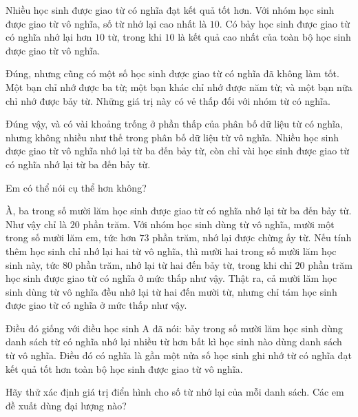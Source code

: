 {\begin{scriptlist}
      \item [Học sinh A:] Nhiều học sinh được giao từ có nghĩa đạt kết quả tốt hơn. Với nhóm học sinh được giao từ vô nghĩa, số từ nhớ lại cao nhất là $10$. Có bảy học sinh được giao từ có nghĩa nhớ lại hơn $10$ từ, trong khi $10$ là kết quả cao nhất của toàn bộ học sinh được giao từ vô nghĩa. \vspace{\baselineskip}

      \item [Học sinh B:] Đúng, nhưng cũng có một số học sinh được giao từ có nghĩa đã không làm tốt. Một bạn chỉ nhớ được ba từ; một bạn khác chỉ nhớ được năm từ; và một bạn nữa chỉ nhớ được bảy từ. Những giá trị này có vẻ thấp đối với nhóm từ có nghĩa.

      \item [Học sinh C:] Đúng vậy, và có vài khoảng trống ở phần thấp của phân bố dữ liệu từ có nghĩa, nhưng không nhiều như thế trong phân bố dữ liệu từ vô nghĩa. Nhiều học sinh được giao từ vô nghĩa nhớ lại từ ba đến bảy từ, còn chỉ vài học sinh được giao từ có nghĩa nhớ lại từ ba đến bảy từ.\vspace{2\baselineskip}

      \item [Giáo viên:] Em có thể nói cụ thể hơn không?

      \item [Học sinh C:] À, ba trong số mười lăm học sinh được giao từ có nghĩa nhớ lại từ ba đến bảy từ. Như vậy chỉ là $20$ phần trăm. Với nhóm học sinh dùng từ vô nghĩa, mười một trong số mười lăm em, tức hơn $73$ phần trăm, nhớ lại được chừng ấy từ. Nếu tính thêm học sinh chỉ nhớ lại hai từ vô nghĩa, thì mười hai trong số mười lăm học sinh này, tức $80$ phần trăm, nhớ lại từ hai đến bảy từ, trong khi chỉ $20$ phần trăm học sinh được giao từ có nghĩa ở mức thấp như vậy. Thật ra, cả mười lăm học sinh dùng từ vô nghĩa đều nhớ lại từ hai đến mười từ, nhưng chỉ tám học sinh được giao từ có nghĩa ở mức thấp như vậy.\vspace{2\baselineskip}

      \item [Giáo viên:] Điều đó giống với điều học sinh A đã nói: bảy trong số mười lăm học sinh dùng danh sách từ có nghĩa nhớ lại nhiều từ hơn bất kì học sinh nào dùng danh sách từ vô nghĩa. Điều đó có nghĩa là gần một nửa số học sinh ghi nhớ từ có nghĩa đạt kết quả tốt hơn toàn bộ học sinh được giao từ vô nghĩa.\vspace{\baselineskip}

      \item [Giáo viên:] Hãy thử xác định giá trị điển hình cho số từ nhớ lại của mỗi danh sách. Các em đề xuất dùng đại lượng nào?


\end{scriptlist}}
